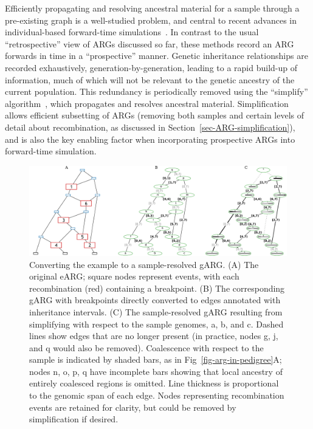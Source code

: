 \documentclass{article}
\newcommand{\noderef}[1]{\textsf{#1}}
\begin{document}
Efficiently propagating and resolving ancestral material for
a sample through a pre-existing graph is a well-studied problem,
and central to recent advances in individual-based forward-time
simulations~\citep{kelleher2018efficient,haller2018tree}.
In contrast to the usual ``retrospective'' view of ARGs
discussed so far, these methods record an ARG forwards in
time in a ``prospective'' manner. Genetic inheritance relationships
are recorded exhaustively, generation-by-generation,
leading to a rapid build-up of information, much of which
will not be relevant to the genetic ancestry of the current population.
This redundancy is periodically removed using the ``simplify''
algorithm~\citep{kelleher2018efficient}, which propagates and
resolves ancestral material.
Simplification allows efficient subsetting of ARGs (removing both samples and
certain levels of detail about recombination, as discussed in
Section~\ref{sec-ARG-simplification}), and is also the key enabling factor when
incorporating prospective ARGs into
forward-time simulation.

\begin{figure}
\centering
\includegraphics[width=\textwidth]{illustrations/ancestry-resolution}
\caption{\label{fig-ancestry-resolution}
Converting the \citet[][Fig.~1]{wiuf1999recombination} example
to a sample-resolved gARG. (A) The original eARG; square nodes represent events, with
each recombination (red) containing a breakpoint.
(B) The corresponding gARG with breakpoints directly converted to
edges annotated with inheritance intervals.
(C) The sample-resolved gARG resulting from simplifying with respect
to the sample genomes, \noderef{a}, \noderef{b}, and \noderef{c}.
Dashed lines show edges that are
no longer present (in practice, nodes \noderef{g}, \noderef{j}, and \noderef{q} would also be removed).
Coalescence with respect to the sample is indicated by shaded bars, as
in Fig~\ref{fig-arg-in-pedigree}A; nodes \noderef{n}, \noderef{o}, \noderef{p}, \noderef{q} have incomplete
bars showing that local ancestry of entirely coalesced regions is omitted.
Line thickness is proportional to the genomic span of each edge.
Nodes representing recombination events are retained
for clarity, but could be removed by simplification if
desired.
}
\end{figure}
\end{document}
